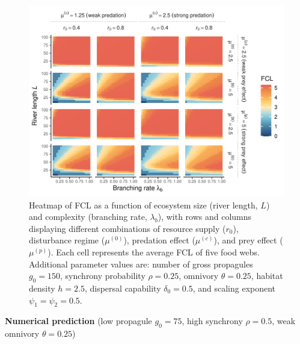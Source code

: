 \begin{figure}
\centering
\includegraphics{../data_fmt/fig_rho025_g150_theta025.pdf}
\caption{Heatmap of FCL as a function of ecosystem size (river length,
\(L\)) and complexity (branching rate, \(\lambda_b\)), with rows and
columns displaying different combinations of resource supply (\(r_0\)),
disturbance regime (\(\mu^{(0)}\)), predation effect (\(\mu^{(c)}\)),
and prey effect (\(\mu^{(p)}\)). Each cell represents the average FCL of
five food webs. Additional parameter values are: number of gross
propagules \(g_0=150\), synchrony probability \(\rho=0.25\), omnivory
\(\theta=0.25\), habitat density \(h=2.5\), dispersal capability
\(\delta_0=0.5\), and scaling exponent \(\psi_1=\psi_2=0.5\).}
\end{figure}

\newpage

\textbf{Numerical prediction} (low propagule \(g_0 = 75\), high
synchrony \(\rho = 0.5\), weak omnivory \(\theta = 0.25\))

